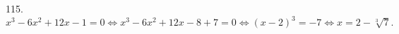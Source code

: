 115. $x^3-6x^2+12x-1=0\Leftrightarrow x^3-6x^2+12x-8+7=0 \Leftrightarrow (x-2)^3=-7 \Leftrightarrow x=2-\sqrt[3]{7}.$\\

